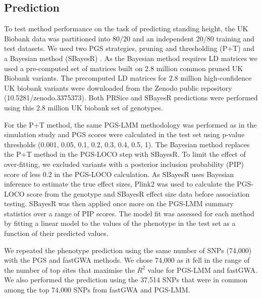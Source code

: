 \documentclass[doublespacing]{bmcart}
\begin{document}
\subsection*{Prediction}
To test method performance on the task of predicting standing height, the UK Biobank data was partitioned into 80/20 and an independent 20/80 training and test datasets. We used two PGS strategies, pruning and thresholding (P+T) and a Bayesian method (SBayesR) \cite{choi2019prsice,lloyd2019improved}. As the Bayesian method requires LD matrices we used a pre-computed set of matrices built on 2.8 million common pruned UK Biobank variants. The precomputed LD matrices for 2.8 million high-confidence UK biobank variants were downloaded from the Zenodo public repository (10.5281/zenodo.3375373). Both PRSice and SBayesR predictions were performed using this 2.8 million UK biobank set of genotypes. \par

For the P+T method, the same PGS-LMM methodology was performed as in the simulation study and PGS scores were calculated in the test set using p-value thresholds (0.001, 0.05, 0.1, 0.2, 0.3, 0.4, 0.5, 1). The Bayesian method replaces the P+T method in the PGS-LOCO step with SBayesR. To limit the effect of over-fitting, we excluded variants with a posterior inclusion probability (PIP) score of less 0.2 in the PGS-LOCO calculation. As SBayesR uses Bayesian inference to estimate the true effect sizes, Plink2 was used to calculate the PGS-LOCO score from the genotype and SBayesR effect size data before association testing. SBayesR was then applied once more on the PGS-LMM summary statistics over a range of PIP scores. The model fit was assessed for each method by fitting a linear model to the values of the phenotype in the test set as a function of their predicted values.\par

We repeated the phenotype prediction using the same number of SNPs (74,000) with the PGS and fastGWA methods. We chose 74,000 as it fell in the range of the number of top sites that maximise the $R^2$ value for PGS-LMM and fastGWA. We also performed the prediction using the 37,514 SNPs that were in common among the top 74,000 SNPs from fastGWA and PGS-LMM.




\end{document}
